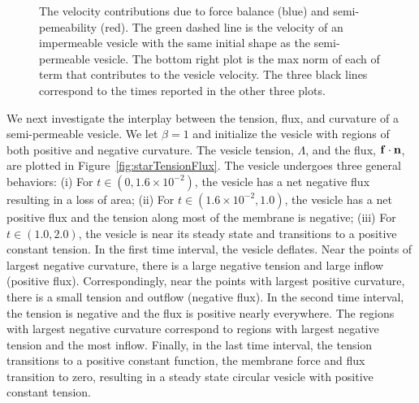 \documentclass[9pt,twocolumn,twoside,lineno]{pnas-new}
\begin{document}
\begin{figure}[htp]
  \caption{\label{fig:vesVelocity} The velocity contributions due to
  force balance (blue) and semi-pemeability (red). The green dashed line
  is the velocity of an impermeable vesicle with the same initial shape
  as the semi-permeable vesicle. The bottom right plot is the max norm
  of each of term that contributes to the vesicle velocity.  The three
  black lines correspond to the times reported in the other three
  plots.}
\end{figure}

We next investigate the interplay between the tension, flux, and
curvature of a semi-permeable vesicle. We let $\beta = 1$ and initialize
the vesicle with regions of both positive and negative curvature. The
vesicle tension, $\Lambda$, and the flux, $\mathbf{f} \cdot \mathbf{n}$, are plotted
in Figure~\ref{fig:starTensionFlux}. The vesicle undergoes three general
behaviors: (i) For $t \in (0,1.6 \times 10^{-2})$, the vesicle has a net
negative flux resulting in a loss of area; (ii) For $t \in (1.6 \times
10^{-2},1.0)$, the vesicle has a net positive flux and the tension along
most of the membrane is negative; (iii) For $t \in (1.0,2.0)$, the
vesicle is near its steady state and transitions to a positive constant
tension. In the first time interval, the vesicle deflates. Near the
points of largest negative curvature, there is a large negative tension
and large inflow (positive flux).  Correspondingly, near the points with
largest positive curvature, there is a small tension and outflow
(negative flux). In the second time interval, the tension is negative
and the flux is positive nearly everywhere. The regions with largest
negative curvature correspond to regions with largest negative tension
and the most inflow. Finally, in the last time interval, the tension
transitions to a positive constant function, the membrane force and flux
transition to zero, resulting in a steady state circular vesicle with
positive constant tension.
\end{document}
